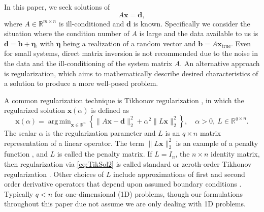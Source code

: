 \documentclass[12pt]{article}
\newcommand{\mA}{m}	%
\newcommand{\mL}{q}	%
\newcommand{\bVec}{\mathbf{b}}	%
\newcommand{\dVec}{\mathbf{d}}	%
\newcommand{\xVec}{\mathbf{x}}	%
\newcommand{\xTrue}{\mathbf{x}_{\text{true}}}	%
\newcommand{\regparam}{\alpha}  %
\newcommand{\xReg}{\xVec(\regparam)}	%
\DeclareMathOperator*{\argmin}{arg\,min}
\newcommand{\noise}{\eta}	%
\newcommand{\noiseVec}{\bm{\noise}}	%
\begin{document}
In this paper, we seek solutions of 
\begin{equation}
\label{eq:Ax = b}
A\xVec = \dVec,
\end{equation}
where $A \in \mathbb{R}^{\mA \times n}$ is ill-conditioned and $\dVec$ is known. Specifically we consider the situation where the condition number of $A$ is large and the data available to us is $\dVec = \bVec + \noiseVec$, with $\noiseVec$ being a realization of a random vector and $\bVec = A\xTrue$. Even for small systems, direct matrix inversion is not recommended due to the noise in the data and the ill-conditioning of the system matrix $A$. An alternative approach is regularization, which aims to mathematically describe desired characteristics of a solution to produce a more well-posed problem. \par
A common regularization technique is Tikhonov regularization \cite{Tikh1963}, in which the regularized solution $\xReg$ is defined as
\begin{equation}
\label{eq:TikSol2}
\xVec(\regparam) = \argmin_{\xVec \in \mathbb{R}^n} \left\{\|A\xVec - \dVec\|_2^2 + \regparam^2\|L\xVec\|_2^2\right\}, \quad \regparam > 0, ~ L \in \mathbb{R}^{\mL \times n}.
\end{equation}
The scalar $\regparam$ is the regularization parameter and $L$ is an $\mL \times n$ matrix representation of a linear operator. The term $\|L\xVec\|_2^2$ is an example of a penalty function \cite{Vogel:2002}, and $L$ is called the penalty matrix. If $L = I_n$, the $n \times n$ identity matrix, then regularization via \eqref{eq:TikSol2} is called standard or zeroth-order Tikhonov regularization \cite{ABT}. Other choices of $L$ include approximations of first and second order derivative operators that depend upon assumed boundary conditions \cite{NeumannDCT,Strang1999,Vogel:2002}. Typically $q < n$ for one-dimensional (1D) problems, though our formulations throughout this paper due not assume we are only dealing with 1D problems. \par 
\end{document}
